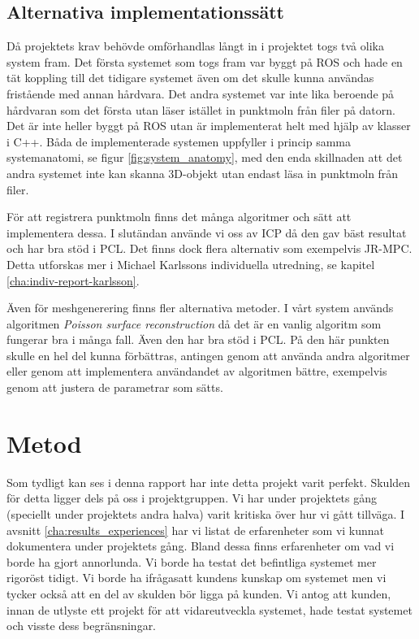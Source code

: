 \subsection{Alternativa implementationssätt}
Då projektets krav behövde omförhandlas långt in i projektet togs två olika system fram. Det första systemet som togs fram var byggt på ROS och hade en tät koppling till det tidigare systemet även om det skulle kunna användas fristående med annan hårdvara. Det andra systemet var inte lika beroende på hårdvaran som det första utan läser istället in punktmoln från filer på datorn. Det är inte heller byggt på ROS utan är implementerat helt med hjälp av klasser i C++. Båda de implementerade systemen uppfyller i princip samma systemanatomi, se figur \ref{fig:system_anatomy}, med den enda skillnaden att det andra systemet inte kan skanna 3D-objekt utan endast läsa in punktmoln från filer.

För att registrera punktmoln finns det många algoritmer och sätt att implementera dessa. I slutändan använde vi oss av ICP då den gav bäst resultat och har bra stöd i PCL. Det finns dock flera alternativ som exempelvis JR-MPC. Detta utforskas mer i Michael Karlssons individuella utredning, se kapitel \ref{cha:indiv-report-karlsson}.

Även för meshgenerering finns fler alternativa metoder. I vårt system används algoritmen \textit{Poisson surface reconstruction} då det är en vanlig algoritm som fungerar bra i många fall. Även den har bra stöd i PCL. På den här punkten skulle en hel del kunna förbättras, antingen genom att använda andra algoritmer eller genom att implementera användandet av algoritmen bättre, exempelvis genom att justera de parametrar som sätts.


\section{Metod}
\label{sec:discussion-method}
Som tydligt kan ses i denna rapport har inte detta projekt varit perfekt. Skulden för detta ligger dels på oss i projektgruppen. Vi har under projektets gång (speciellt under projektets andra halva) varit kritiska över hur vi gått tillväga. I avsnitt \ref{cha:results_experiences} har vi listat de erfarenheter som vi kunnat dokumentera under projektets gång. Bland dessa finns erfarenheter om vad vi borde ha gjort annorlunda. Vi borde ha testat det befintliga systemet mer rigoröst tidigt. Vi borde ha ifrågasatt kundens kunskap om systemet men vi tycker också att en del av skulden bör ligga på kunden. Vi antog att kunden, innan de utlyste ett projekt för att vidareutveckla systemet, hade testat systemet och visste dess begränsningar.

